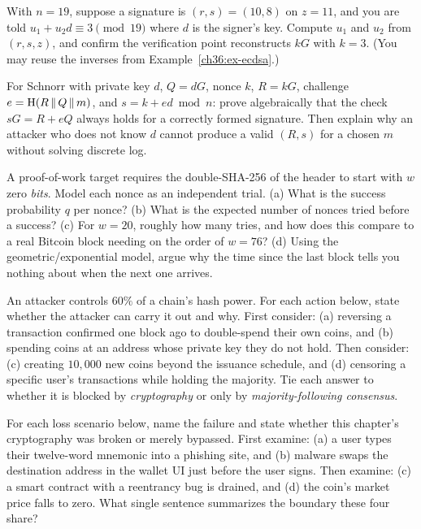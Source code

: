 \begin{exercise}
\label{ch36:ex-verify}
With $n=19$, suppose a signature is $(r,s)=(10,8)$ on $z=11$, and you are told $u_1 + u_2 d \equiv 3 \pmod{19}$ where $d$ is the signer's key. Compute $u_1$ and $u_2$ from $(r,s,z)$, and confirm the verification point reconstructs $kG$ with $k=3$. (You may reuse the inverses from Example~\ref{ch36:ex-ecdsa}.)
\end{exercise}

\begin{exercise}
\label{ch36:ex-schnorr}
For Schnorr with private key $d$, $Q=dG$, nonce $k$, $R=kG$, challenge $e=\operatorname{H}(R\,\|\, Q\,\|\, m)$, and $s=k+ed \bmod n$: prove algebraically that the check $sG = R + eQ$ always holds for a correctly formed signature. Then explain why an attacker who does not know $d$ cannot produce a valid $(R,s)$ for a chosen $m$ without solving discrete log.
\end{exercise}

\begin{exercise}
\label{ch36:ex-mining}
A proof-of-work target requires the double-SHA-256 of the header to start with $w$ zero \emph{bits}. Model each nonce as an independent trial. (a) What is the success probability $q$ per nonce? (b) What is the expected number of nonces tried before a success? (c) For $w=20$, roughly how many tries, and how does this compare to a real Bitcoin block needing on the order of $w=76$? (d) Using the geometric/exponential model, argue why the time since the last block tells you nothing about when the next one arrives.
\end{exercise}

\begin{exercise}[51\% scope]
\label{ch36:ex-fiftyone}
An attacker controls $60\%$ of a chain's hash power. For each action below, state whether the attacker can carry it out and why. First consider: (a) reversing a transaction confirmed one block ago to double-spend their own coins, and (b) spending coins at an address whose private key they do not hold. Then consider: (c) creating $10{,}000$ new coins beyond the issuance schedule, and (d) censoring a specific user's transactions while holding the majority. Tie each answer to whether it is blocked by \emph{cryptography} or only by \emph{majority-following consensus}.
\end{exercise}

\begin{exercise}
\label{ch36:ex-notcover}
For each loss scenario below, name the failure and state whether this chapter's cryptography was broken or merely bypassed. First examine: (a) a user types their twelve-word mnemonic into a phishing site, and (b) malware swaps the destination address in the wallet UI just before the user signs. Then examine: (c) a smart contract with a reentrancy bug is drained, and (d) the coin's market price falls to zero. What single sentence summarizes the boundary these four share?
\end{exercise}

